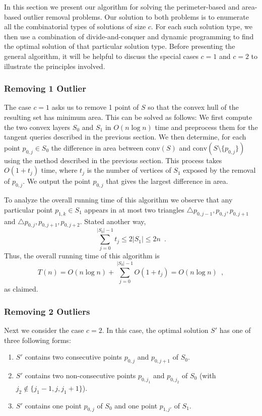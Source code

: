 \documentclass{elsart}
\newcommand{\ch}{\mathrm{conv}}
\begin{document}
In this section we present our algorithm for solving the
perimeter-based and area-based outlier removal problems. Our solution
to both problems is to enumerate all the combinatorial types of
solutions of size $c$.  For each such solution type, we then use a
combination of divide-and-conquer and dynamic programming to find the
optimal solution of that particular solution type.  Before presenting
the general algorithm, it will be helpful to discuss the special cases
$c=1$ and $c=2$ to illustrate the principles involved.

\subsubsection{Removing 1 Outlier}

The case $c=1$ asks us to remove 1 point of $S$ so that the convex
hull of the resulting set has minimum area.  This can be solved as
follows: We first compute the two convex layers $S_0$ and $S_1$ in
$O(n\log n)$ time and preprocess them for the tangent queries
described in the previous section.  We then determine, for each point
$p_{0,j}\in S_0$ the difference in area between $\ch(S)$ and
$\ch(S\setminus\{p_{0,j}\})$ using the method described in the
previous section.  This process takes $O(1+t_j)$ time, where $t_j$ is
the number of vertices of $S_1$ exposed by the removal of $p_{0,j}$.
We output the point $p_{0,j}$ that gives the largest difference in
area.

To analyze the overall running time of this algorithm we observe that
any particular point $p_{1,k}\in S_1$ appears in at most two triangles
$\triangle p_{0,j-1},p_{0,j},p_{0,j+1}$ and
$\triangle p_{0,j},p_{0,j+1},p_{0,j+2}$.  Stated another way,
\[
     \sum_{j=0}^{|S_0|-1} t_j \le 2|S_1|\le 2n \enspace .
\]
Thus, the overall running time of this algorithm is
\[
     T(n) = O(n\log n)+\sum_{j=0}^{|S_0|-1} O(1+t_j) = O(n\log n) \enspace ,
\]
as claimed.

\subsubsection{Removing 2 Outliers}

Next we consider the case $c=2$.  In this case, the optimal solution
$S'$ has one of three following forms:

\begin{enumerate}

\item $S'$ contains two consecutive points $p_{0,j}$ and $p_{0,j+1}$
of $S_0$.

\item $S'$ contains two non-consecutive points $p_{0,j_1}$ and
$p_{0,j_2}$ of $S_0$ (with $j_2\not\in\{j_1-1,j,j_1+1\}$).

\item $S'$ contains one point $p_{0,j}$ of $S_0$ and one point
$p_{1,j'}$ of $S_1$.

\end{enumerate}
\end{document}
